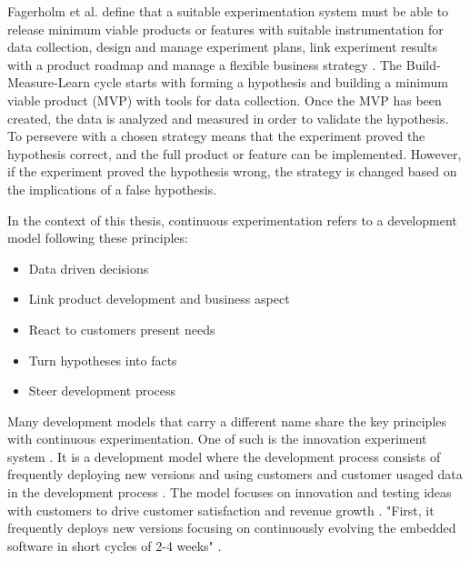 \documentclass[english]{tktltiki2}
\theoremstyle{definition}
\theoremstyle{remark}
\begin{document}
Fagerholm et al. define that a suitable experimentation system must be able to release minimum viable products or features with suitable instrumentation for data collection, design and manage experiment plans, link experiment results with a product roadmap and manage a flexible business strategy \cite{fagerholm2014building}. The Build-Measure-Learn cycle starts with forming a hypothesis and building a minimum viable product (MVP) with tools for data collection. Once the MVP has been created, the data is analyzed and measured in order to validate the hypothesis. To persevere with a chosen strategy means that the experiment proved the hypothesis correct, and the full product or feature can be implemented. However, if the experiment proved the hypothesis wrong, the strategy is changed based on the implications of a false hypothesis.

In the context of this thesis, continuous experimentation refers to a development model following these principles: 
\begin{itemize}
\item  Data driven decisions
\item  Link product development and business aspect
\item  React to customers present needs
\item  Turn hypotheses into facts
\item  Steer development process
\end{itemize}

Many development models that carry a different name share the key principles with continuous experimentation. One of such is the innovation experiment system \cite{bosch2012building}. It is a development model where the development process consists of frequently deploying new versions and using customers and customer usaged data in the development process \cite{bosch2012building}. The model focuses on innovation and testing ideas with customers to drive customer satisfaction and revenue growth \cite{bosch2012building}. "First, it frequently deploys new versions focusing on continuously evolving the embedded software in short cycles of 2-4 weeks" \cite{eklund2012architecture}.

\end{document}
